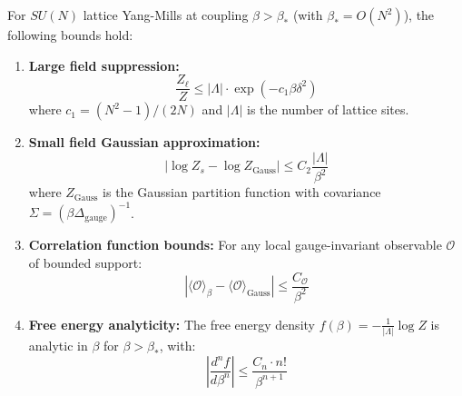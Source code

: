 \begin{theorem}
\label{thm:balaban-rigorous}
For $SU(N)$ lattice Yang-Mills at coupling $\beta > \beta_*$ (with $\beta_* = O(N^2)$), 
the following bounds hold:

\begin{enumerate}[label=(\roman*)]
\item \textbf{Large field suppression:}
\[
\frac{Z_\ell}{Z} \leq |\Lambda| \cdot \exp\left(-c_1 \beta \delta^2\right)
\]
where $c_1 = (N^2-1)/(2N)$ and $|\Lambda|$ is the number of lattice sites.

\item \textbf{Small field Gaussian approximation:}
\[
\left| \log Z_s - \log Z_{\mathrm{Gauss}} \right| \leq C_2 \frac{|\Lambda|}{\beta^2}
\]
where $Z_{\mathrm{Gauss}}$ is the Gaussian partition function with covariance 
$\Sigma = (\beta \Delta_{\mathrm{gauge}})^{-1}$.

\item \textbf{Correlation function bounds:}
For any local gauge-invariant observable $\mathcal{O}$ of bounded support:
\[
\left| \langle \mathcal{O} \rangle_\beta - \langle \mathcal{O} \rangle_{\mathrm{Gauss}} \right| 
\leq \frac{C_\mathcal{O}}{\beta^2}
\]

\item \textbf{Free energy analyticity:}
The free energy density $f(\beta) = -\frac{1}{|\Lambda|}\log Z$ is analytic 
in $\beta$ for $\beta > \beta_*$, with:
\[
\left| \frac{d^n f}{d\beta^n} \right| \leq \frac{C_n \cdot n!}{\beta^{n+1}}
\]
\end{enumerate}
\end{theorem}

